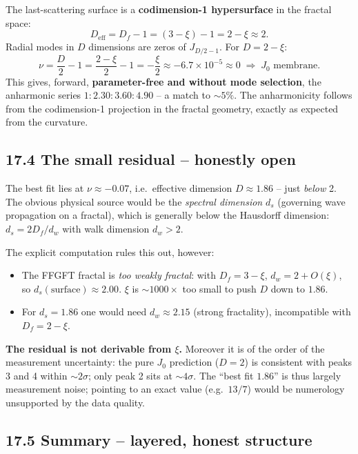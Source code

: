 The last-scattering surface is a \textbf{codimension-1 hypersurface} in the
fractal space:
\[
  D_\mathrm{eff} = D_f - 1 = (3-\xi) - 1 = 2 - \xi \approx 2.
\]
Radial modes in $D$ dimensions are zeros of $J_{D/2-1}$. For $D = 2-\xi$:
\[
  \nu = \frac{D}{2}-1 = \frac{2-\xi}{2}-1 = -\frac{\xi}{2}
      \approx -6.7\times10^{-5} \approx 0
  \;\Rightarrow\; J_0\text{ membrane}.
\]
This gives, forward, \textbf{parameter-free and without mode selection}, the
anharmonic series $1:2.30:3.60:4.90$ -- a match to $\sim5\%$. The anharmonicity
follows from the codimension-1 projection in the fractal geometry, exactly as
expected from the curvature.

\subsection*{17.4 The small residual -- honestly open}

The best fit lies at $\nu\approx-0.07$, i.e.\ effective dimension
$D\approx1.86$ -- just \emph{below} 2. The obvious physical source would be the
\emph{spectral dimension} $d_s$ (governing wave propagation on a fractal),
which is generally below the Hausdorff dimension: $d_s = 2D_f/d_w$ with walk
dimension $d_w>2$.

The explicit computation rules this out, however:
\begin{itemize}
  \item The FFGFT fractal is \emph{too weakly fractal}: with $D_f=3-\xi$,
        $d_w = 2+O(\xi)$, so $d_s(\text{surface})\approx2.00$. $\xi$ is
        $\sim1000\times$ too small to push $D$ down to $1.86$.
  \item For $d_s=1.86$ one would need $d_w\approx2.15$ (strong fractality),
        incompatible with $D_f=2-\xi$.
\end{itemize}
\textbf{The residual is not derivable from $\xi$.} Moreover it is of the order
of the measurement uncertainty: the pure $J_0$ prediction ($D=2$) is consistent
with peaks 3 and 4 within $\sim2\sigma$; only peak 2 sits at $\sim4\sigma$. The
``best fit $1.86$'' is thus largely measurement noise; pointing to an exact
value (e.g.\ $13/7$) would be numerology unsupported by the data quality.

\subsection*{17.5 Summary -- layered, honest structure}


